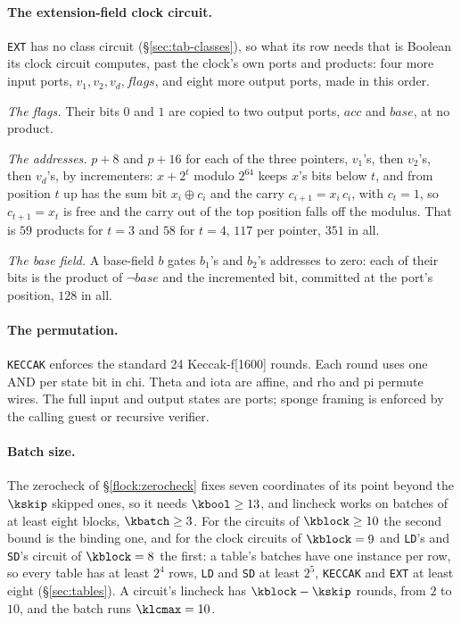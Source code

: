 \paragraph{The extension-field clock circuit.} \texttt{EXT} has no class circuit (\S\ref{sec:tab-classes}), so what its row needs that is Boolean its clock circuit computes, past the clock's own ports and products: four more input ports, $v_1,v_2,v_d,\mathit{flags}$, and eight more output ports, made in this order.

\emph{The flags.} Their bits $0$ and $1$ are copied to two output ports, $\mathit{acc}$ and $\mathit{base}$, at no product.

\emph{The addresses.} $p+8$ and $p+16$ for each of the three pointers, $v_1$'s, then $v_2$'s, then $v_d$'s, by incrementers: $x+2^{t}$ modulo $2^{64}$ keeps $x$'s bits below $t$, and from position $t$ up has the sum bit $x_i\oplus c_i$ and the carry $c_{i+1}=x_i\,c_i$, with $c_t=1$, so $c_{t+1}=x_t$ is free and the carry out of the top position falls off the modulus. That is $59$ products for $t=3$ and $58$ for $t=4$, $117$ per pointer, $351$ in all.

\emph{The base field.} A base-field $b$ gates $b_1$'s and $b_2$'s addresses to zero: each of their bits is the product of $\neg\mathit{base}$ and the incremented bit, committed at the port's position, $128$ in all.

\paragraph{The permutation.} \texttt{KECCAK} enforces the standard 24 Keccak-f[1600] rounds. Each round uses one AND per state bit in chi. Theta and iota are affine, and rho and pi permute wires. The full input and output states are ports; sponge framing is enforced by the calling guest or recursive verifier.

\paragraph{Batch size.} The zerocheck of \S\ref{flock:zerocheck} fixes seven coordinates of its point beyond the $\kskip$ skipped ones, so it needs $\kbool\ge13$, and lincheck works on batches of at least eight blocks, $\kbatch\ge3$. For the circuits of $\kblock\ge10$ the second bound is the binding one, and for the clock circuits of $\kblock=9$ and \texttt{LD}'s and \texttt{SD}'s circuit of $\kblock=8$ the first: a table's batches have one instance per row, so every table has at least $2^{4}$ rows, \texttt{LD} and \texttt{SD} at least $2^{5}$, \texttt{KECCAK} and \texttt{EXT} at least eight (\S\ref{sec:tables}). A circuit's lincheck has $\kblock-\kskip$ rounds, from $2$ to $10$, and the batch runs $\klcmax=10$.

